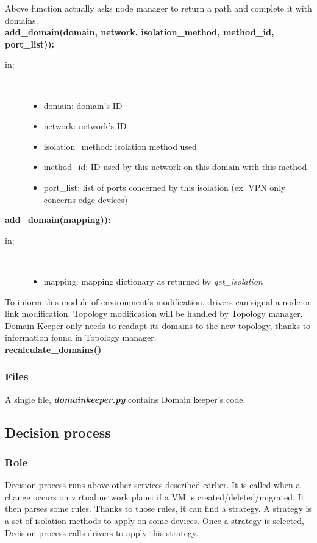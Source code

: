 Above function actually asks node manager to return a path and complete it with domains.\\
\textbf{add\_domain(domain, network, isolation\_method, method\_id, port\_list)):}
\begin{description}
    \item[in:] \hfill \\
        \begin{itemize}
            \item domain: domain’s ID
            \item network: network’s ID
            \item isolation\_method: isolation method used
            \item method\_id: ID used by this network on this domain with this method
            \item port\_list: list of ports concerned by this isolation (ex: VPN only concerns edge devices)
        \end{itemize}
\end{description}
\textbf{add\_domain(mapping)):}
\begin{description}
    \item[in:] \hfill \\
        \begin{itemize}
            \item mapping: mapping dictionary as returned by \emph{get\_isolation}
        \end{itemize}
\end{description}
To inform this module of environment’s modification, drivers can signal a node or link modification. Topology modification will be handled by Topology manager. Domain Keeper only needs to readapt its domains to the new topology, thanks to information found in Topology manager.\\
\textbf{recalculate\_domains()}

\subsubsection{Files}
A single file, \emph{\textbf{domainkeeper.py}} contains Domain keeper's code.

\subsection{Decision process}
\subsubsection{Role}
Decision process runs above other services described earlier. It is called when a change occurs on virtual network plane: if a VM is created/deleted/migrated. It then parses some rules. Thanks to those rules, it can find a strategy. A strategy is a set of isolation methods to apply on some devices. Once a strategy is selected, Decision process calls drivers to apply this strategy.\\

